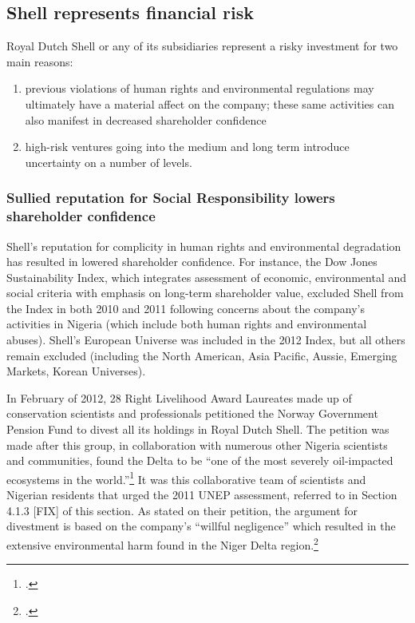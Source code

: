 


	\subsection{Shell represents financial risk}
	


Royal Dutch Shell or any of its subsidiaries represent a risky investment for two main reasons:
\begin{enumerate}
	\item previous violations of human rights and environmental regulations may ultimately have a material affect on the company; these same activities can also manifest in decreased shareholder confidence
	\item high-risk ventures going into the medium and long term introduce uncertainty on a number of levels.
\end{enumerate}

	
	
	\subsubsection{Sullied reputation for Social Responsibility lowers shareholder confidence}
	
	
	
Shell's reputation for complicity in human rights and environmental degradation has resulted in lowered shareholder confidence. 
For instance, the Dow Jones Sustainability Index, which integrates assessment of economic, environmental and social criteria with emphasis on long-term shareholder value, excluded Shell from the Index in both 2010 and 2011 following concerns about the company's activities in Nigeria (which include both human rights and environmental abuses). 
Shell's European Universe was included in the 2012 Index, but all others remain excluded (including the North American, Asia Pacific, Aussie, Emerging Markets, Korean Universes).



In February of 2012, 28 Right Livelihood Award Laureates made up of conservation scientists and professionals petitioned the Norway Government Pension Fund to divest all its holdings in Royal Dutch Shell. 
The petition was made after this group, in collaboration with numerous other Nigeria scientists and communities, found the Delta to be ``one of the most severely oil-impacted ecosystems in the world.''\footcite[][]{NigerDeltaReport_2006}
It was this collaborative team of scientists and Nigerian residents that urged the 2011 UNEP assessment, referred to in Section 4.1.3 [FIX] of this section. 
As stated on their petition, the argument for divestment is based on the company's ``willful negligence'' which resulted in the extensive environmental harm found in the Niger Delta region.\footcite[][]{NorwayPetition_2012}



